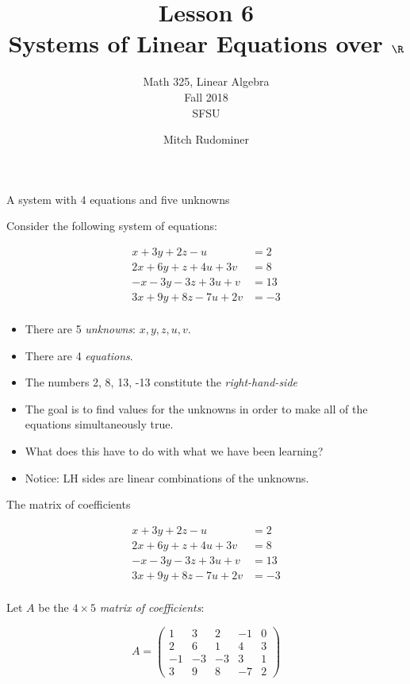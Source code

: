 \documentclass{beamer}
\title{Lesson 6 \\ Systems of Linear Equations over $\R$}
\subtitle{Math 325, Linear Algebra \\ Fall 2018 \\ SFSU}
\author{Mitch Rudominer}
\date{}
\begin{document}
\begin{frame}
  \titlepage
\end{frame}

\begin{frame}{A system with 4 equations and five unknowns}

Consider the following system of equations:

\begin{align*}
 x + 3y + 2z - u  \qquad &= 2 \\
2x + 6y + z + 4u + 3v  &= 8 \\
-x -3y  -3z + 3u + v  &= 13 \\
3x + 9y + 8z  -7u + 2v  &= -3 \\
\end{align*}

\begin{itemize}
\item There are 5 \emph{unknowns}: $x, y, z, u, v$.
\item There are 4 \emph{equations}.
\item The numbers 2, 8, 13, -13 constitute the \emph{right-hand-side}
\item The goal is to find values for the unknowns in order to make all of the
equations simultaneously true.
\item What does this have to do with what we have been learning?
\item Notice: LH sides are linear combinations of the unknowns.
\end{itemize}

\end{frame}


\begin{frame}{The matrix of coefficients}

\begin{align*}
 x + 3y + 2z - u  \qquad &= 2 \\
2x + 6y + z + 4u + 3v  &= 8 \\
-x -3y  -3z + 3u + v  &= 13 \\
3x + 9y + 8z  -7u + 2v  &= -3 \\
\end{align*}

Let $A$ be the $4 \times 5$ \emph{matrix of coefficients}:

$$
A =
\begin{pmatrix}
1 & 3 & 2 & -1 & 0 \\
2 & 6 & 1 & 4 & 3\\
-1 & -3 & -3 & 3 & 1 \\
3 & 9 & 8 & -7 & 2
\end{pmatrix}
$$

\end{frame}
\end{document}
